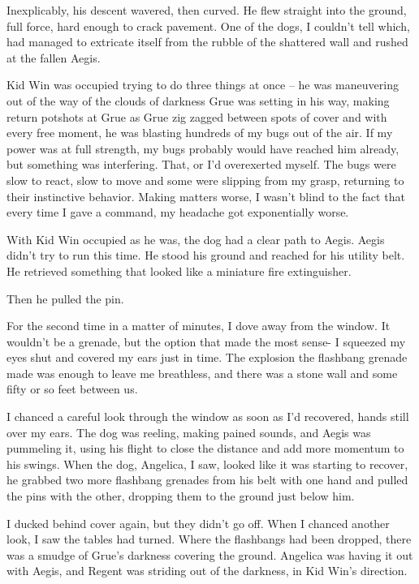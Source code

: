 Inexplicably, his descent wavered, then curved.  He flew straight into the ground, full force, hard enough to crack pavement.  One of the dogs, I couldn't tell which, had managed to extricate itself from the rubble of the shattered wall and rushed at the fallen Aegis.



Kid Win was occupied trying to do three things at once – he was maneuvering out of the way of the clouds of darkness Grue was setting in his way, making return potshots at Grue as Grue zig zagged between spots of cover and with every free moment, he was blasting hundreds of my bugs out of the air.  If my power was at full strength, my bugs probably would have reached him already, but something was interfering.  That, or I'd overexerted myself.  The bugs were slow to react, slow to move and some were slipping from my grasp, returning to their instinctive behavior.  Making matters worse, I wasn't blind to the fact that every time I gave a command, my headache got exponentially worse.



With Kid Win occupied as he was, the dog had a clear path to Aegis.  Aegis didn't try to run this time.  He stood his ground and reached for his utility belt.  He retrieved something that looked like a miniature fire extinguisher.



Then he pulled the pin.



For the second time in a matter of minutes, I dove away from the window.  It wouldn't be a grenade, but the option that made the most sense-  I squeezed my eyes shut and covered my ears just in time.  The explosion the flashbang grenade made was enough to leave me breathless, and there was a stone wall and some fifty or so feet between us.



I chanced a careful look through the window as soon as I'd recovered, hands still over my ears.  The dog was reeling, making pained sounds, and Aegis was pummeling it, using his flight to close the distance and add more momentum to his swings.  When the dog, Angelica, I saw, looked like it was starting to recover, he grabbed two more flashbang grenades from his belt with one hand and pulled the pins with the other, dropping them to the ground just below him.



I ducked behind cover again, but they didn't go off.  When I chanced another look, I saw the tables had turned.  Where the flashbangs had been dropped, there was a smudge of Grue's darkness covering the ground.  Angelica was having it out with Aegis, and Regent was striding out of the darkness, in Kid Win's direction.



